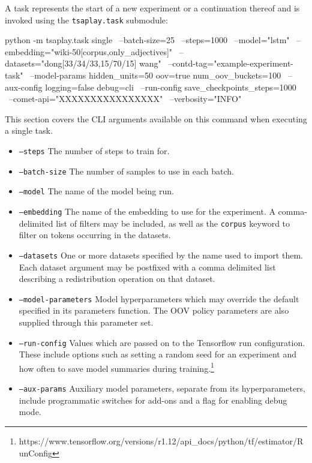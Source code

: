 \documentclass[../../fyp.tex]{subfiles}
\begin{document}
A task represents the start of a new experiment or a continuation thereof and is invoked using the \texttt{tsaplay.task} submodule: 
\begin{code}
	python -m tsaplay.task single \ 
		--batch-size=25 \ 
		--steps=1000 \  
		--model="lstm" \  
		--embedding="wiki-50[corpus,only_adjectives]" \ 
		--datasets="dong[33/34/33,15/70/15] wang" \ 
		--contd-tag="example-experiment-task" \ 
		--model-params hidden_units=50 oov=true num_oov_buckets=100 \ 
		--aux-config logging=false debug=cli \ 
		--run-config save_checkpoints_steps=1000 \
		--comet-api="XXXXXXXXXXXXXXXX" \
		--verbosity="INFO"
\end{code}

This section covers the CLI arguments available on this command when executing a single task.
\begin{itemize}
\item \texttt{--steps} The number of steps to train for.
\item \texttt{--batch-size} The number of samples to use in each batch.
\item \texttt{--model} The name of the model being run. 
\item \texttt{--embedding} The name of the embedding to use for the experiment. A comma-delimited list of filters may be included, as well as the \texttt{corpus} keyword to filter on tokens occurring in the datasets. 
\item \texttt{--datasets} One or more datasets specified by the name used to import them. Each dataset argument may be postfixed with a comma delimited list describing a redistribution operation on that dataset. 
\item \texttt{--model-parameters} Model hyperparameters which may override the default specified in its parameters function. The OOV policy parameters are also supplied through this parameter set.  
\item \texttt{--run-config} Values which are passed on to the Tensorflow run configuration. These include options such as setting a random seed for an experiment and how often to save model summaries during training.\footnote{https://www.tensorflow.org/versions/r1.12/api\_docs/python/tf/estimator/RunConfig}
\item \texttt{--aux-params} Auxiliary model parameters, separate from its hyperparameters, include programmatic switches for add-ons and a flag for enabling debug mode.

\end{itemize}
\end{document}
